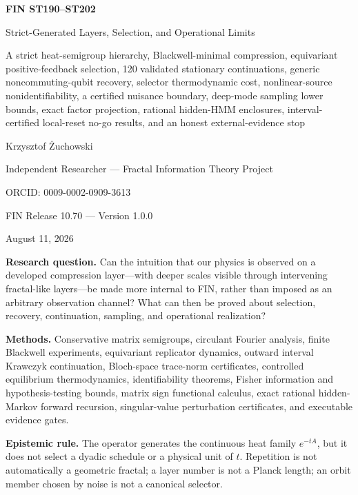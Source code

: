\documentclass[11pt,a4paper]{article}
\begin{document}
\begin{titlepage}
\centering
\vspace*{0.60cm}
{\LARGE\bfseries FIN ST190--ST202\par}
\vspace{0.24cm}
{\Large Strict-Generated Layers, Selection, and Operational Limits\par}
\vspace{0.34cm}
{\large A strict heat-semigroup hierarchy, Blackwell-minimal compression, equivariant positive-feedback selection, 120 validated stationary continuations, generic noncommuting-qubit recovery, selector thermodynamic cost, nonlinear-source nonidentifiability, a certified nuisance boundary, deep-mode sampling lower bounds, exact factor projection, rational hidden-HMM enclosures, interval-certified local-reset no-go results, and an honest external-evidence stop\par}
\vspace{0.65cm}
{\Large Krzysztof \.{Z}uchowski\par}
\vspace{0.16cm}
{\large Independent Researcher --- Fractal Information Theory Project\par}
{\large ORCID: 0009-0002-0909-3613\par}
\vspace{0.45cm}
{\large FIN Release 10.70 --- Version 1.0.0\par}
{\large August 11, 2026\par}
\vfill
\begin{minipage}{0.93\textwidth}
\textbf{Research question.} Can the intuition that our physics is observed on a developed compression layer---with deeper scales visible through intervening fractal-like layers---be made more internal to FIN, rather than imposed as an arbitrary observation channel? What can then be proved about selection, recovery, continuation, sampling, and operational realization?\par
\textbf{Methods.} Conservative matrix semigroups, circulant Fourier analysis, finite Blackwell experiments, equivariant replicator dynamics, outward interval Krawczyk continuation, Bloch-space trace-norm certificates, controlled equilibrium thermodynamics, identifiability theorems, Fisher information and hypothesis-testing bounds, matrix sign functional calculus, exact rational hidden-Markov forward recursion, singular-value perturbation certificates, and executable evidence gates.\par
\textbf{Epistemic rule.} The operator generates the continuous heat family $e^{-tA}$, but it does not select a dyadic schedule or a physical unit of $t$. Repetition is not automatically a geometric fractal; a layer number is not a Planck length; an orbit member chosen by noise is not a canonical selector.\par

\end{minipage}
\end{titlepage}
\end{document}
